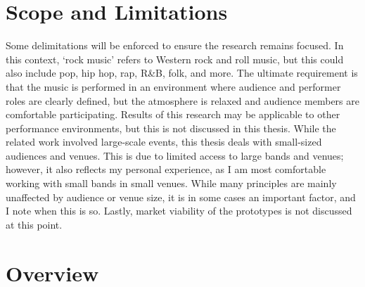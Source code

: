 \section{Scope and Limitations}

Some delimitations will be enforced to ensure the research remains focused. In this context, `rock music' refers to Western rock and roll music, but this could also include pop, hip hop, rap, R\&B, folk, and more. The ultimate requirement is that the music is performed in an environment where audience and performer roles are clearly defined, but the atmosphere is relaxed and audience members are comfortable participating. Results of this research may be applicable to other performance environments, but this is not discussed in this thesis. While the related work involved large-scale events, this thesis deals with small-sized audiences and venues. This is due to limited access to large bands and venues; however, it also reflects my personal experience, as I am most comfortable working with small bands in small venues. While many principles are mainly unaffected by audience or venue size, it is in some cases an important factor, and I note when this is so. Lastly, market viability of the prototypes is not discussed at this point.



\section{Overview}

